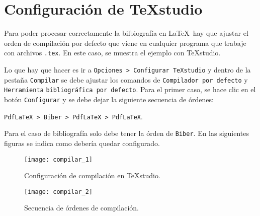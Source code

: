 \newpage
\section{Configuración  de TeXstudio}

Para poder procesar correctamente la bilbiografía en \LaTeX\ hay que ajustar el orden de compilación por defecto que viene en cualquier programa que trabaje con archivos \verb|.tex|. En este caso, se muestra el ejemplo con TeXstudio.

Lo que hay que hacer es ir a \verb|Opciones > Configurar TeXstudio| y dentro de la pestaña \verb|Compilar| se debe ajustar los comandos de \verb|Compilador por defecto| y \verb|Herramienta|  \verb|bibliográfica por defecto|. Para el primer caso, se hace clic en el botón \verb|Configurar| y se debe dejar la siguiente secuencia de órdenes: 
\begin{center}
	\verb|PdfLaTeX > Biber > PdfLaTeX > PdfLaTeX|.
\end{center}
Para el caso de bibliografía solo debe tener la órden de \verb|Biber|. En las siguientes figuras se indica como debería quedar configurado.
\begin{figure}[h]
	\centering
	\texttt{[image: compilar\_1]}
	\caption{Configuración de compilación en TeXstudio.}
	\label{fig:compilar1}
\end{figure}

\begin{figure}[h]
	\centering
	\texttt{[image: compilar\_2]}
	\caption{Secuencia de órdenes de compilación.}
	\label{fig:compilar2}
\end{figure}

\newpage




